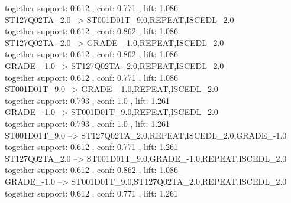 \documentclass[12pt, a4paper, oneside]{ctexart}
\begin{document}
 together support: 0.612 , conf: 0.771 , lift: 1.086\\
ST127Q02TA\_2.0 --> ST001D01T\_9.0,REPEAT,ISCEDL\_2.0 \\
 together support: 0.612 , conf: 0.862 , lift: 1.086\\
ST127Q02TA\_2.0 --> GRADE\_-1.0,REPEAT,ISCEDL\_2.0 \\
 together support: 0.612 , conf: 0.862 , lift: 1.086\\
GRADE\_-1.0 --> ST127Q02TA\_2.0,REPEAT,ISCEDL\_2.0 \\
 together support: 0.612 , conf: 0.771 , lift: 1.086\\
ST001D01T\_9.0 --> GRADE\_-1.0,REPEAT,ISCEDL\_2.0 \\
  together support: 0.793 , conf: 1.0 , lift: 1.261\\
GRADE\_-1.0 --> ST001D01T\_9.0,REPEAT,ISCEDL\_2.0 \\
  together support: 0.793 , conf: 1.0 , lift: 1.261\\
ST001D01T\_9.0 --> ST127Q02TA\_2.0,REPEAT,ISCEDL\_2.0,GRADE\_-1.0 \\
 together support: 0.612 , conf: 0.771 , lift: 1.261\\
ST127Q02TA\_2.0 --> ST001D01T\_9.0,GRADE\_-1.0,REPEAT,ISCEDL\_2.0 \\
 together support: 0.612 , conf: 0.862 , lift: 1.086\\
GRADE\_-1.0 --> ST001D01T\_9.0,ST127Q02TA\_2.0,REPEAT,ISCEDL\_2.0 \\
 together support: 0.612 , conf: 0.771 , lift: 1.261\\
\end{document}
